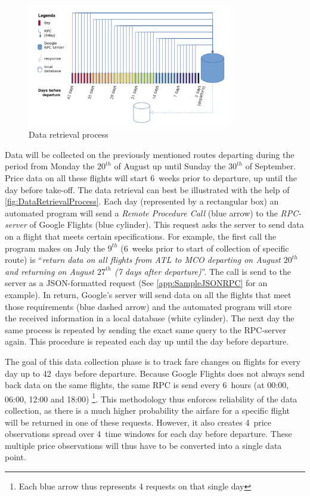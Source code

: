 \begin{figure}
\centering
\includegraphics[width=0.8\textwidth]{figures/DataRetrievalProcess}
\caption{Data retrieval process}
\label{fig:DataRetrievalProcess}
\end{figure}

Data will be collected on the previously mentioned routes departing during the period from Monday the $20^{th}$ of August up until Sunday the $30^{th}$ of September. Price data on all these flights will start 6~weeks prior to departure, up until the day before take-off. The data retrieval can best be illustrated with the help of \autoref{fig:DataRetrievalProcess}. Each day (represented by a rectangular box) an automated program will send a \emph{Remote Procedure Call} (blue arrow) to the \emph{RPC-server} of Google Flights (blue cylinder). This request asks the server to send data on a flight that meets certain specifications. For example, the first call the program makes on July the $9^{th}$ (6~weeks prior to start of collection of specific route) is ``\emph{return data on all flights from ATL to MCO departing on August $20^{th}$ and returning on August $27^{th}$ (7 days after departure)}''. The call is send to the server as a JSON-formatted request (See \autoref{app:SampleJSONRPC} for an example). In return, Google's server will send data on all the flights that meet those requirements (blue dashed arrow) and the automated program will store the received information in a local database (white cylinder). The next day the same process is repeated by sending the exact same query to the RPC-server again. This procedure is repeated each day up until the day before departure.

The goal of this data collection phase is to track fare changes on flights for every day up to 42~days before departure. Because Google Flights does not always send back data on the same flights, the same RPC is send every 6~hours (at 00:00, 06:00, 12:00 and 18:00) \footnote{Each blue arrow thus represents 4 requests on that single day}. This methodology thus enforces reliability of the data collection, as there is a much higher probability the airfare for a specific flight will be returned in one of these requests. However, it also creates 4~price observations spread over 4~time windows for each day before departure. These multiple price observations will thus have to be converted into a single data point.

